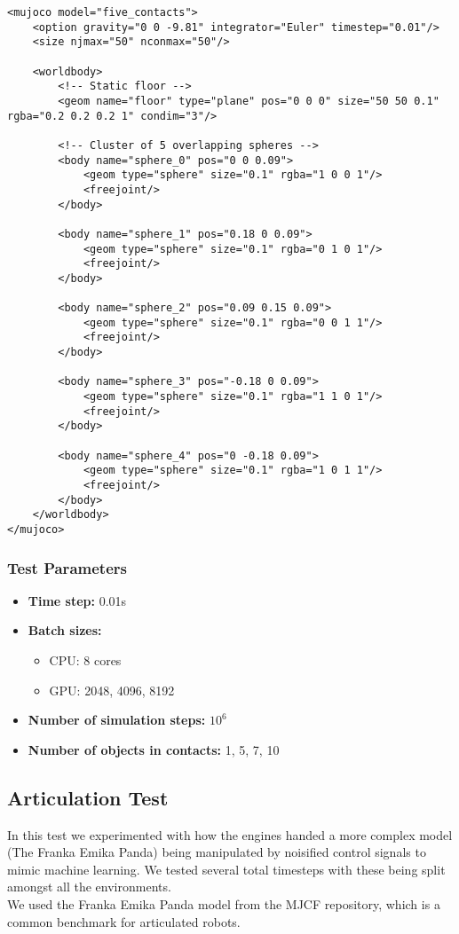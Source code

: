 \documentclass[11pt,a4paper]{article}
\begin{document}
\begin{lstlisting}[style=xmlstyle, caption={Contacts XML model}, label=lst:contacts_xml]
<mujoco model="five_contacts">
    <option gravity="0 0 -9.81" integrator="Euler" timestep="0.01"/>
    <size njmax="50" nconmax="50"/>

    <worldbody>
        <!-- Static floor -->
        <geom name="floor" type="plane" pos="0 0 0" size="50 50 0.1" rgba="0.2 0.2 0.2 1" condim="3"/>

        <!-- Cluster of 5 overlapping spheres -->
        <body name="sphere_0" pos="0 0 0.09">
            <geom type="sphere" size="0.1" rgba="1 0 0 1"/>
            <freejoint/>
        </body>

        <body name="sphere_1" pos="0.18 0 0.09">
            <geom type="sphere" size="0.1" rgba="0 1 0 1"/>
            <freejoint/>
        </body>

        <body name="sphere_2" pos="0.09 0.15 0.09">
            <geom type="sphere" size="0.1" rgba="0 0 1 1"/>
            <freejoint/>
        </body>

        <body name="sphere_3" pos="-0.18 0 0.09">
            <geom type="sphere" size="0.1" rgba="1 1 0 1"/>
            <freejoint/>
        </body>

        <body name="sphere_4" pos="0 -0.18 0.09">
            <geom type="sphere" size="0.1" rgba="1 0 1 1"/>
            <freejoint/>
        </body>
    </worldbody>
</mujoco>
\end{lstlisting}

\subsubsection{Test Parameters}
\begin{itemize}
    \item \textbf{Time step:} 0.01s
    \item \textbf{Batch sizes:} 
    \begin{itemize}
        \item CPU: 8 cores 
        \item GPU: 2048, 4096, 8192
    \end{itemize}
    \item \textbf{Number of simulation steps:} $10^6$
    \item \textbf{Number of objects in contacts:} 1, 5, 7, 10
\end{itemize}

\subsection{Articulation Test}
In this test we experimented with how the engines handed a more complex model (The Franka Emika Panda) being manipulated by noisified control signals to mimic machine learning. We tested several total timesteps with these being split amongst all the environments. \\
We used the Franka Emika Panda model from the MJCF repository, which is a common benchmark for articulated robots.
\end{document}

